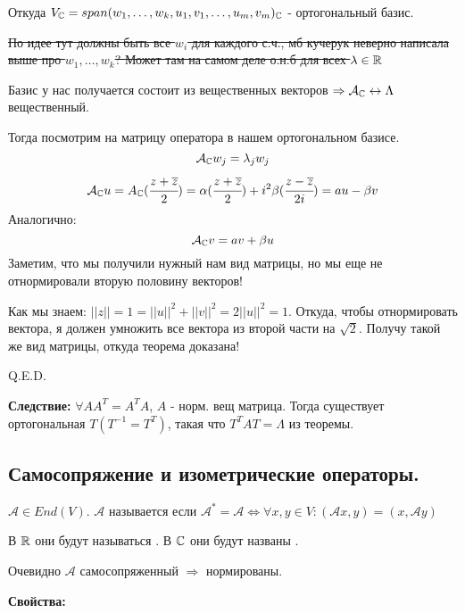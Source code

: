 Откуда $V_{\mathbb{C}} = span(w_1,\ldots,w_k, u_1,v_1,\ldots,u_m,v_m)_{\mathbb{C}}$ - ортогональный базис.

\sout{По идее тут должны быть все $w_i$ для каждого с.ч., мб кучерук неверно написала выше про $w_1,\ldots,w_k$? Может там на самом деле о.н.б для всех $\lambda\in\mathbb{R}$}

Базис у нас получается состоит из вещественных векторов $\Rightarrow \mathcal{A}_{\mathbb{C}}\leftrightarrow \Lambda$ вещественный. 

Тогда посмотрим на матрицу оператора в нашем ортогональном базисе. 
$$\mathcal{A}_{\mathbb{C}} w_j = \lambda_j w_j$$
$$ \mathcal{A}_{\mathbb{C}} u = A_{\mathbb{C}} (\cfrac{z + \overline{z}}{2}) =\alpha (\cfrac{z+\overline{z}}{2}) + i^2 \beta (\cfrac{z-\overline{z}}{2i})  = au - \beta v$$
Аналогично:
$$\mathcal{A}_{\mathbb{C}} v = av + \beta u$$
Заметим, что мы получили нужный нам вид матрицы, но мы еще не отнормировали вторую половину векторов!

Как мы знаем: $||z|| = 1 =||u||^2 + ||v ||^2 = 2 ||u||^2 = 1$. Откуда, чтобы отнормировать вектора, я должен умножить все вектора из второй части на $\sqrt{2}$. Получу такой же вид матрицы, откуда теорема доказана!

\hfill Q.E.D.

\textbf{Следствие:} $\forall AA^T =A^T A$, $A$ - норм. вещ матрица. Тогда существует ортогональная $T (T^{-1}=T^T)$, такая что $T^TAT = \Lambda$ из теоремы.






\newpage
\subsection{Самосопряжение и изометрические операторы.}


 $\mathcal{A}\in End(V)$. $\mathcal{A}$ называется  если $\mathcal{A}^* =\mathcal{A} \Leftrightarrow \forall x,y \in V: (\mathcal{A}x,y) = (x,\mathcal{A}y) $

В $\mathbb{R}$ они будут называться . В $\mathbb{C}$ они будут названы . 

Очевидно $\mathcal{A}$ самосопряженный $\Rightarrow$ нормированы.

\textbf{Свойства:}

